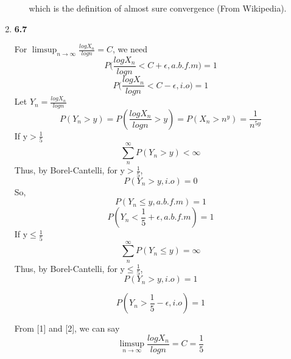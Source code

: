 \documentclass[a4paper,11pt]{article}
\begin{document}
\begin{enumerate}
\begin{enumerate}
which is the definition of almost sure convergence (From Wikipedia).
\end{enumerate}
\item {\bf 6.7}

For $\limsup_{n \to \infty} \frac{log X_n}{log n}= C$, we need
\[P\bigg(\frac{log X_n}{log n} <C +\epsilon, a.b.f.m \bigg)=1\]
\[P\bigg(\frac{log X_n}{log n} <C -\epsilon, i.o \bigg)=1\]
Let $Y_n = \frac{log X_n}{log n}$
\[P(Y_n> y)= P(\frac{log X_n}{log n}>y)= P(X_n>n^y)=\frac{1}{n^{5y}}\]
If y$>\frac{1}{5}$
\[\sum_{n}^{\infty}P(Y_n> y)<\infty\]
Thus, by Borel-Cantelli, for y$>\frac{1}{5}$,
\[P(Y_n> y, i.o)=0\]
So,
\[P(Y_n \leq y, a.b.f.m)=1\]
\begin{equation}
P(Y_n < \frac{1}{5} + \epsilon, a.b.f.m)=1
\end{equation}
If y$\leq\frac{1}{5}$
\[\sum_{n}^{\infty}P(Y_n\leq y)=\infty\]
Thus, by Borel-Cantelli, for y$\leq\frac{1}{5}$,
\[P(Y_n> y, i.o)=1\]

\begin{equation}
P(Y_n > \frac{1}{5} - \epsilon, i.o)=1
\end{equation}

From [1] and [2], we can say
\[\limsup_{n \to \infty} \frac{log X_n}{log n}= C=\frac{1}{5}\]


\end{enumerate}  
\end{document}
